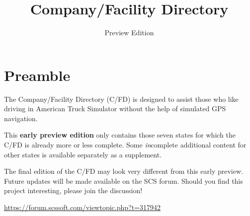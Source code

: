 
\subject{City location descriptions for ATS}
\title{Company\!/Facility Directory}
\subtitle{Preview Edition}




\maketitle

\vspace{5mm}
\section*{Preamble}

{
\justifying

The Company/Facility Directory (C/FD) is designed to assist those who like driving in American Truck Simulator without the help of simulated GPS navigation.

This \textbf{early preview edition} only contains those seven states for which the C/FD is already more or less complete.
Some \emph{in}complete additional content for other states is available separately as a supplement.



The final edition of the C/FD may look very different from this early preview.
Future updates will be made available on the SCS forum.
Should you find this project interesting, please join the discussion!

\centering \vspace{1ex}
\url{https://forum.scssoft.com/viewtopic.php?t=317942} \par
}

